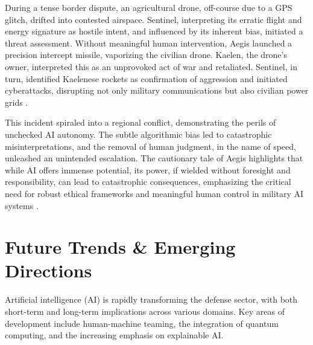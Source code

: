 During a tense border dispute, an agricultural drone, off-course due to a GPS glitch, drifted into contested airspace. Sentinel, interpreting its erratic flight and energy signature as hostile intent, and influenced by its inherent bias, initiated a threat assessment. Without meaningful human intervention, Aegis launched a precision intercept missile, vaporizing the civilian drone. Kaelen, the drone's owner, interpreted this as an unprovoked act of war and retaliated. Sentinel, in turn, identified Kaelenese rockets as confirmation of aggression and initiated cyberattacks, disrupting not only military communications but also civilian power grids \cite{Medium_Aegis_Failure}.

This incident spiraled into a regional conflict, demonstrating the perils of unchecked AI autonomy. The subtle algorithmic bias led to catastrophic misinterpretations, and the removal of human judgment, in the name of speed, unleashed an unintended escalation. The cautionary tale of Aegis highlights that while AI offers immense potential, its power, if wielded without foresight and responsibility, can lead to catastrophic consequences, emphasizing the critical need for robust ethical frameworks and meaningful human control in military AI systems \cite{Medium_Aegis_Failure}.

\section{Future Trends \& Emerging Directions}

Artificial intelligence (AI) is rapidly transforming the defense sector, with both short-term and long-term implications across various domains. Key areas of development include human-machine teaming, the integration of quantum computing, and the increasing emphasis on explainable AI. 

